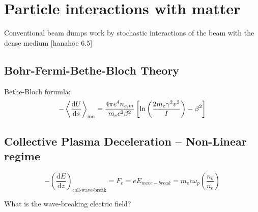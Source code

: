 \clearpage
\section{Particle interactions with matter}
Conventional beam dumps work by stochastic interactions of the beam with the dense medium [hanahoe 6.5]
\subsection{Bohr-Fermi-Bethe-Bloch Theory}
Bethe-Bloch forumla:
\begin{equation}
-\expval{\frac{\mathrm{d}U}{\mathrm{d}s}}_{\text{ion}}=\frac{4\pi e^4n_{e,m}}{m_ec^2\beta^2}\left[\ln\left(\frac{2m_e\gamma^2v^2}{I}\right) -\beta^2\right]
\end{equation}

\subsection{Collective Plasma Deceleration -- Non-Linear regime }

\begin{equation}
-\left(\frac{\mathrm{d}E}{\mathrm{d}z}\right)_{\text{coll-wave-break}}=F_e=eE_{wave-break}=m_e c\omega_{p}\left(\frac{n_b}{n_e}\right)
\end{equation}

What is the wave-breaking electric field?



